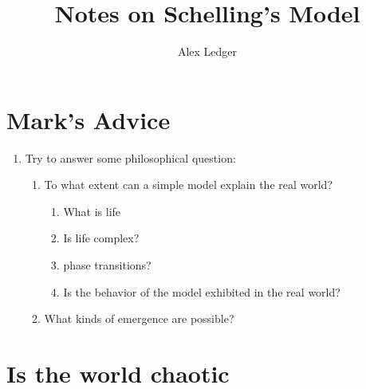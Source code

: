 \documentclass[11pt]{article}
\title{Notes on Schelling's Model}
\author{Alex Ledger}
\begin{document}
\maketitle
\tableofcontents
\newpage

\section{Mark's Advice}
    \begin{enumerate}
        \item Try to answer some philosophical question:
            \begin{enumerate}
                \item To what extent can a simple model explain the real world?
                    \begin{enumerate}
                        \item What is life
                        \item Is life complex?
                        \item phase transitions?
                        \item Is the behavior of the model exhibited in the real world?
                    \end{enumerate}
                \item What kinds of emergence are possible?
            \end{enumerate}
    \end{enumerate}

\section{Is the world chaotic}
\end{document}
